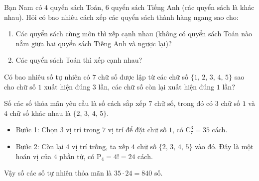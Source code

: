 \begin{ex}%
Bạn Nam có $4$ quyển sách Toán, $6$ quyển sách Tiếng Anh (các quyển sách là khác nhau). Hỏi có bao nhiêu cách xếp các quyển sách thành hàng ngang sao cho:
\begin{enumerate}
	\item Các quyển sách cùng môn thì xếp cạnh nhau (không có quyển sách Toán nào nằm giữa hai quyển sách Tiếng Anh và ngược lại)?
	\item Các quyển sách Toán thì xếp cạnh nhau?
\end{enumerate}
\end{ex}
\begin{ex}%
	Có bao nhiêu số tự nhiên có $7$ chữ số được lập từ các chữ số $\{1,\,2,\,3,\,4,\,5\}$ sao cho chữ số $1$ xuất hiện đúng $3$ lần, các chữ số còn lại xuất hiện đúng $1$ lần?
	\loigiai
	{
		Số các số thỏa mãn yêu cầu là số cách sắp xếp $7$ chữ số, trong đó có $3$ chữ số $1$ và $4$ chữ số khác nhau là $\{2,\,3,\,4,\,5\}$.
		\begin{itemize}
			\item Bước 1: Chọn $3$ vị trí trong $7$ vị trí để đặt chữ số $1$, có $\mathrm{C}_7^3 = 35$ cách.
			\item Bước 2: Còn lại $4$ vị trí trống, ta xếp $4$ chữ số $\{2,\,3,\,4,\,5\}$ vào đó. Đây là một hoán vị của $4$ phần tử, có $\mathrm{P}_4 = 4! = 24$ cách.
		\end{itemize}
		Vậy số các số tự nhiên thỏa mãn là $35 \cdot  24 = 840$ số.
	}
\end{ex}
